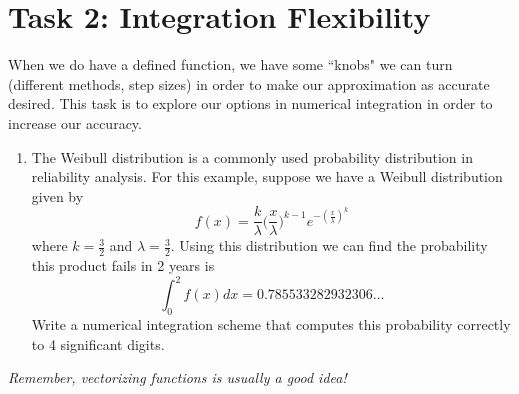 \documentclass[11pt]{article}
\begin{document}
	\section*{Task 2: Integration Flexibility}
	\noindent When we do have a defined function, we have some ``knobs" we can turn (different methods, step sizes) in order to make our approximation as accurate desired. This task is to explore our options in numerical integration in order to increase our accuracy.\\
	\begin{enumerate}[label=\alph*)]
		\item The Weibull distribution is a commonly used probability distribution in reliability analysis. For this example, suppose we have a Weibull distribution given by 
		\begin{equation*}
			\displaystyle f(x) = \frac{k}{\lambda}\Big(\frac{x}{\lambda}\Big)^{k-1}e^{-(\frac{x}{\lambda})^k}
		\end{equation*}
		where $k=\frac{3}{2}$ and $\lambda = \frac{3}{2}$. Using this distribution we can find the probability this product fails in 2 years is 
		\begin{equation*}
			\int_0^2f(x)dx = 0.785533282932306\dots
		\end{equation*}
		Write a numerical integration scheme that computes this probability correctly to 4 significant digits.
	\end{enumerate}

	\begin{center}
		\vfill
		\textit{Remember, vectorizing functions is usually a good idea!}
	\end{center}
\end{document}
